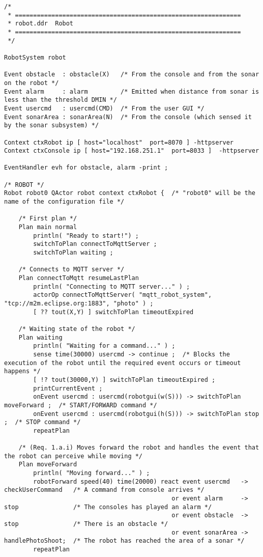 \documentclass[a4paper]{article}
\begin{document}
\begin{lstlisting}
/* 
 * ==============================================================
 * robot.ddr  Robot
 * ==============================================================
 */ 
 
RobotSystem robot       

Event obstacle  : obstacle(X)   /* From the console and from the sonar on the robot */
Event alarm     : alarm         /* Emitted when distance from sonar is less than the threshold DMIN */
Event usercmd   : usercmd(CMD)  /* From the user GUI */
Event sonarArea : sonarArea(N)  /* From the console (which sensed it by the sonar subsystem) */

Context ctxRobot ip [ host="localhost"  port=8070 ] -httpserver
Context ctxConsole ip [ host="192.168.251.1"  port=8033 ]  -httpserver

EventHandler evh for obstacle, alarm -print ;
     
/* ROBOT */
Robot robot0 QActor robot context ctxRobot {  /* "robot0" will be the name of the configuration file */

	/* First plan */
   	Plan main normal
 		println( "Ready to start!") ;
		switchToPlan connectToMqttServer ;
		switchToPlan waiting ;
	
	/* Connects to MQTT server */
	Plan connectToMqtt resumeLastPlan  
 		println( "Connecting to MQTT server..." ) ;
		actorOp connectToMqttServer( "mqtt_robot_system", "tcp://m2m.eclipse.org:1883", "photo" ) ;
		[ ?? tout(X,Y) ] switchToPlan timeoutExpired
		
	/* Waiting state of the robot */
	Plan waiting
		println( "Waiting for a command..." ) ;
		sense time(30000) usercmd -> continue ;  /* Blocks the execution of the robot until the required event occurs or timeout happens */
		[ !? tout(30000,Y) ] switchToPlan timeoutExpired ;
  		printCurrentEvent ;
		onEvent usercmd : usercmd(robotgui(w(S))) -> switchToPlan moveForward ;  /* START/FORWARD command */
		onEvent usercmd : usercmd(robotgui(h(S))) -> switchToPlan stop ;  /* STOP command */
		repeatPlan

	/* (Req. 1.a.i) Moves forward the robot and handles the event that the robot can perceive while moving */
 	Plan moveForward
		println( "Moving forward..." ) ;
		robotForward speed(40) time(20000) react event usercmd   -> checkUserCommand   /* A command from console arrives */
											  or event alarm     -> stop               /* The consoles has played an alarm */
											  or event obstacle  -> stop   		       /* There is an obstacle */
											  or event sonarArea -> handlePhotoShoot;  /* The robot has reached the area of a sonar */
		repeatPlan


\end{lstlisting}
\end{document}
